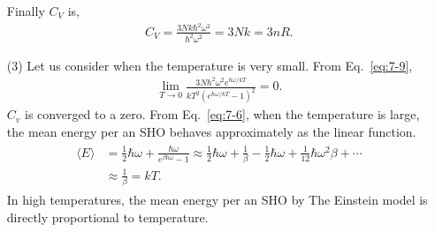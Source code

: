 \documentclass[floatfix,nofootinbib,superscriptaddress,fleqn]{revtex4-2}
\begin{document}
\begin{itemize}
  Finally $C_V$ is,
  \begin{align}
    C_V = \frac{3Nk\hbar^2\omega^2}
    {\hbar^2\omega^2}=3Nk = 3nR.
  \end{align}
  \item[(3)] Let us consider when the temperature is very small.
  From Eq.~\eqref{eq:7-9},
  \begin{align}
    \lim_{T\rightarrow 0}\frac{3N\hbar^2\omega^2e^{\hbar\omega/kT}}
    {kT^2\left(e^{\hbar\omega/kT}-1\right)^2} = 0.
  \end{align} 
  $C_v$ is converged to a zero.
  From Eq.~\eqref{eq:7-6}, when the temperature is large,
  the mean energy per an SHO behaves approximately as the linear function.
   \begin{align}
    \begin{split}
      \langle E\rangle &=\frac{1}{2}\hbar\omega
      +\frac{\hbar\omega}{e^{\beta\hbar\omega}-1} 
      \approx \frac{1}{2}\hbar\omega
      +\frac{1}{\beta}-\frac{1}{2}\hbar\omega
      +\frac{1}{12}\hbar\omega^2\beta+\cdots  \\
      &\approx \frac{1}{\beta} = kT.
    \end{split}
   \end{align} 
   In high temperatures, the mean energy per an SHO by The Einstein model is
   directly proportional to temperature.
\end{itemize}
\end{document}
